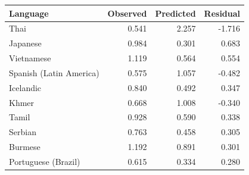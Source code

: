 \begin{tabular}{lrrr}
\toprule
Language & Observed & Predicted & Residual\\
\midrule
Thai & 0.541 & 2.257 & -1.716\\
Japanese & 0.984 & 0.301 & 0.683\\
Vietnamese & 1.119 & 0.564 & 0.554\\
Spanish (Latin America) & 0.575 & 1.057 & -0.482\\
Icelandic & 0.840 & 0.492 & 0.347\\
Khmer & 0.668 & 1.008 & -0.340\\
Tamil & 0.928 & 0.590 & 0.338\\
Serbian & 0.763 & 0.458 & 0.305\\
Burmese & 1.192 & 0.891 & 0.301\\
Portuguese (Brazil) & 0.615 & 0.334 & 0.280\\
\bottomrule
\end{tabular}
